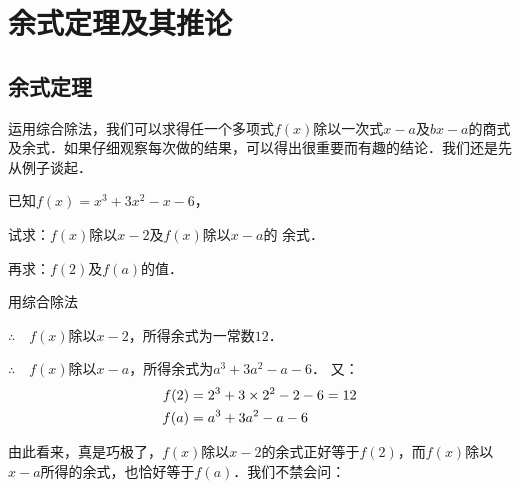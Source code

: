 \section{余式定理及其推论}
\subsection{余式定理}
运用综合除法，我们可以求得任一个多项式$f(x)$除以一次式$x-a$及$bx-a$的商式及余式．如果仔细观察每次做的结果，可以得出很重要而有趣的结论．我们还是先从例子谈起．

\begin{example}
已知$f(x)=x^3+3x^2-x-6$，

    试求：$f(x)$除以$x-2$及$f(x)$除以$x-a$的
    余式．

    再求：$f(2)$及$f(a)$的值．
\end{example}

\begin{solution}
用综合除法   
\begin{center}
\end{center}
$\therefore\quad f(x)$除以$x-2$，所得余式为一常数$12$．

\begin{center}
    \end{center}
$\therefore\quad f(x)$除以$x-a$，所得余式为$a^3+3a^2-a-6$．
又：
\[\begin{split}
f(2)&= 2^3+3\times 2^2-2-6=12 \\
f(a)&= a^3+3a^2-a-6   
\end{split}\]
\end{solution}


由此看来，真是巧极了，$f(x)$除以$x-2$的余式正好等于$f(2)$，而$f(x)$除以$x-a$所得的余式，也恰好等于$f(a)$．我们不禁会问：

